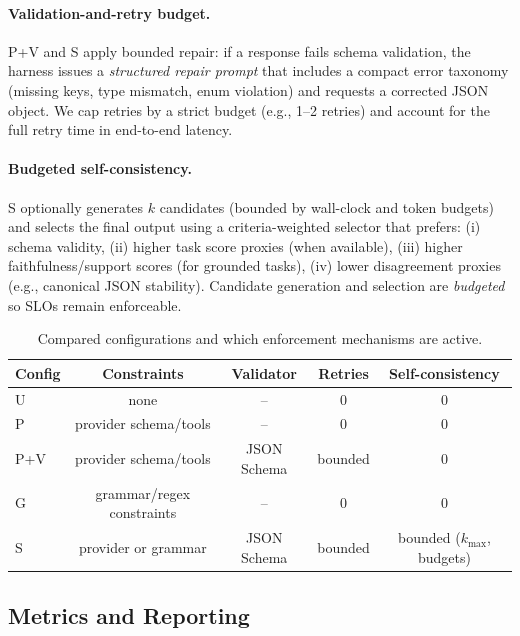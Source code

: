 \documentclass[11pt]{article}
\begin{document}
\paragraph{Validation-and-retry budget.}
P+V and S apply bounded repair: if a response fails schema validation, the harness issues a \emph{structured repair prompt} that includes a compact error taxonomy (missing keys, type mismatch, enum violation) and requests a corrected JSON object.
We cap retries by a strict budget (e.g., 1--2 retries) and account for the full retry time in end-to-end latency.

\paragraph{Budgeted self-consistency.}
S optionally generates $k$ candidates (bounded by wall-clock and token budgets) and selects the final output using a criteria-weighted selector that prefers:
(i) schema validity,
(ii) higher task score proxies (when available),
(iii) higher faithfulness/support scores (for grounded tasks),
(iv) lower disagreement proxies (e.g., canonical JSON stability).
Candidate generation and selection are \emph{budgeted} so SLOs remain enforceable.

\begin{table}[t]
\centering
\small
\begin{tabular}{@{}lcccc@{}}
\toprule
\textbf{Config} & \textbf{Constraints} & \textbf{Validator} & \textbf{Retries} & \textbf{Self-consistency} \\
\midrule
U   & none & -- & 0 & 0 \\
P   & provider schema/tools & -- & 0 & 0 \\
P+V & provider schema/tools & JSON Schema & bounded & 0 \\
G   & grammar/regex constraints & -- & 0 & 0 \\
S   & provider or grammar & JSON Schema & bounded & bounded ($k_{\max}$, budgets) \\
\bottomrule
\end{tabular}
\caption{Compared configurations and which enforcement mechanisms are active.}
\label{tab:config-summary}
\end{table}

\subsection{Metrics and Reporting}
\label{sec:metrics}
\label{sec:metrics-reporting}
\end{document}

